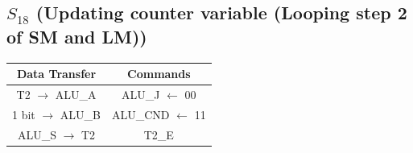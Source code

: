 \documentclass[]{report}
\begin{document}
            \subsection*{$S_{18}$ (Updating counter variable (Looping step 2 of SM and LM))} %
            \begin{center}
                \begin{tabular}{|c|c|}
                    \hline
                    Data Transfer & Commands \\
                    \hline
                    T2 $\to$ ALU\_A & ALU\_J $\leftarrow$ 00\\
                    1 bit $\to$ ALU\_B & ALU\_CND $\leftarrow$ 11\\
                    ALU\_S $\to$ T2 & T2\_E\\
                    \hline
                \end{tabular}
            \end{center} 

\end{document}
